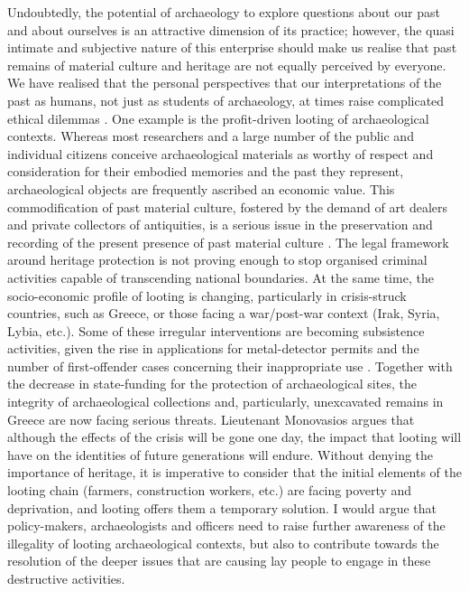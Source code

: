 		Undoubtedly, the potential of archaeology to explore questions about our past and about ourselves is an attractive dimension of its practice; however, the quasi intimate and subjective nature of this enterprise should make us realise that past remains of material culture and heritage are not equally perceived by everyone. We have realised that the personal perspectives that our interpretations of the past as humans, not just as students of archaeology, at times raise complicated ethical dilemmas \parencite{Scarre_2006}. One example is the profit-driven looting of archaeological contexts. Whereas most researchers and a large number of the public and individual citizens conceive archaeological materials as worthy of respect and consideration for their embodied memories and the past they represent, archaeological objects are frequently ascribed an economic value. This commodification of past material culture, fostered by the demand of art dealers and private collectors of antiquities, is a serious issue in the preservation and recording of the present presence of past material culture \parencite{Proulx_2013}. The legal framework around heritage protection is not proving enough to stop organised criminal activities capable of transcending national boundaries. At the same time, the socio-economic profile of looting is changing, particularly in crisis-struck countries, such as Greece, or those facing a war/post-war context (Irak, Syria, Lybia, etc.). Some of these irregular interventions are becoming subsistence activities, given the rise in applications for metal-detector permits and the number of first-offender cases concerning their inappropriate use \parencite{Skoumas_2015}. Together with the decrease in state-funding for the protection of archaeological sites, the integrity of archaeological collections and, particularly, unexcavated remains in Greece are now facing serious threats. Lieutenant Monovasios \parencite[in][]{Skoumas_2015} argues that although the effects of the crisis will be gone one day, the impact that looting will have on the identities of future generations will endure. Without denying the importance of heritage, it is imperative to consider that the initial elements of the looting chain (farmers, construction workers, etc.) are facing poverty and deprivation, and looting offers them a temporary solution. I would argue that policy-makers, archaeologists and officers need to raise further awareness of the illegality of looting archaeological contexts, but also to contribute towards the resolution of the deeper issues that are causing lay people to engage in these destructive activities.

